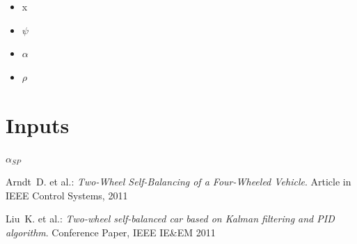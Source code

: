 \documentclass[conference]{IEEEtran}
\begin{document}
\begin{itemize}
    \item x
    \item $\psi$
    \item $\alpha$
    \item $\rho$
\end{itemize}

\section{Inputs}
$\alpha_{SP}$

 
 
 
\begin{thebibliography}{1}

 {\sc Arndt~D. et al.}: {\it Two-Wheel Self-Balancing of a Four-Wheeled Vehicle}. Article in IEEE Control Systems, 2011

 {\sc Liu~K. et al.}: {\it Two-wheel self-balanced car based on Kalman filtering and PID algorithm}. Conference Paper, IEEE IE\&EM 2011


\end{thebibliography}


\end{document}
